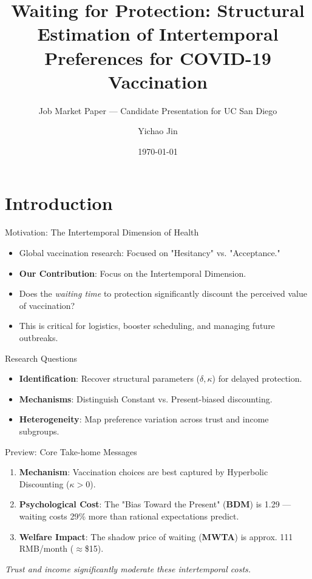 \documentclass[10pt]{beamer}
\title{Waiting for Protection: Structural Estimation of Intertemporal Preferences for COVID-19 Vaccination}
\subtitle{Job Market Paper --- Candidate Presentation for UC San Diego}
\author{Yichao Jin}
\institute{The University of Texas at Dallas}
\date{\today}
\begin{document}
\maketitle

\section{Introduction}

\begin{frame}{Motivation: The Intertemporal Dimension of Health}
    \begin{itemize}
        \item Global vaccination research: Focused on "Hesitancy" vs. "Acceptance."
        \item \textbf{Our Contribution}: Focus on the \alert{Intertemporal Dimension}.
        \item Does the \textit{waiting time} to protection significantly discount the perceived value of vaccination?
        \item This is critical for logistics, booster scheduling, and managing future outbreaks.
    \end{itemize}
\end{frame}

\begin{frame}{Research Questions}
    \begin{itemize}
        \item \textbf{Identification}: Recover structural parameters ($\delta, \kappa$) for delayed protection.
        \item \textbf{Mechanisms}: Distinguish Constant vs. \alert{Present-biased} discounting.
        \item \textbf{Heterogeneity}: Map preference variation across trust and income subgroups.
    \end{itemize}
\end{frame}

\begin{frame}{Preview: Core Take-home Messages}
    \begin{enumerate}
        \item \textbf{Mechanism}: Vaccination choices are best captured by \alert{Hyperbolic Discounting} ($\kappa > 0$).
        \item \textbf{Psychological Cost}: The "Bias Toward the Present" (\textbf{BDM}) is \alert{1.29} --- waiting costs 29\% more than rational expectations predict.
        \item \textbf{Welfare Impact}: The shadow price of waiting (\textbf{MWTA}) is approx. \alert{111 RMB/month} ($\approx$\$15).
    \end{enumerate}
    \vfill
    \begin{center}
        \textit{Trust and income significantly moderate these intertemporal costs.}
    \end{center}
\end{frame}
\end{document}
